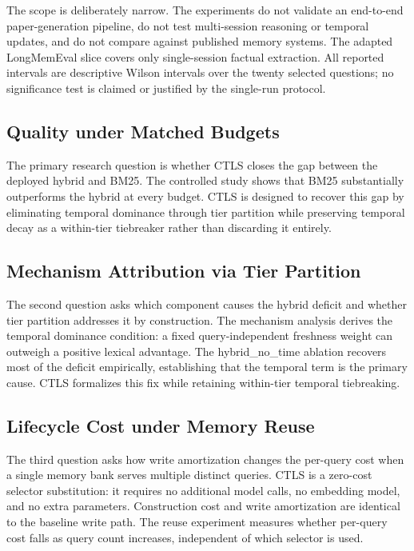 The scope is deliberately narrow. The experiments do not validate an end-to-end paper-generation pipeline, do not test multi-session reasoning or temporal updates, and do not compare against published memory systems. The adapted LongMemEval slice covers only single-session factual extraction. All reported intervals are descriptive Wilson intervals over the twenty selected questions; no significance test is claimed or justified by the single-run protocol.

\subsection{Quality under Matched Budgets}

\label{sec:rq_quality}

The primary research question is whether CTLS closes the gap between the deployed hybrid and BM25. The controlled study shows that BM25 substantially outperforms the hybrid at every budget. CTLS is designed to recover this gap by eliminating temporal dominance through tier partition while preserving temporal decay as a within-tier tiebreaker rather than discarding it entirely.

\subsection{Mechanism Attribution via Tier Partition}

\label{sec:rq_attribution}

The second question asks which component causes the hybrid deficit and whether tier partition addresses it by construction. The mechanism analysis derives the temporal dominance condition: a fixed query-independent freshness weight can outweigh a positive lexical advantage. The hybrid\_no\_time ablation recovers most of the deficit empirically, establishing that the temporal term is the primary cause. CTLS formalizes this fix while retaining within-tier temporal tiebreaking.

\subsection{Lifecycle Cost under Memory Reuse}

\label{sec:rq_lifecycle}

The third question asks how write amortization changes the per-query cost when a single memory bank serves multiple distinct queries. CTLS is a zero-cost selector substitution: it requires no additional model calls, no embedding model, and no extra parameters. Construction cost and write amortization are identical to the baseline write path. The reuse experiment measures whether per-query cost falls as query count increases, independent of which selector is used.
